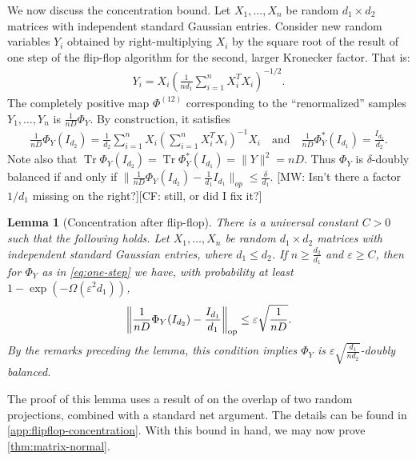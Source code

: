 \documentclass[aos]{imsart}
\newtheorem{lemma}[theorem]{Lemma}
\theoremstyle{definition}
\numberwithin{equation}{section}
\DeclareMathOperator{\op}{op}
\DeclareMathOperator{\tr}{Tr}
\DeclarePairedDelimiter{\norm}{\lVert}{\rVert}
\newcommand{\eps}{\varepsilon}
\newcommand{\CF}[1]{{\color{purple}[CF: #1]}}
\newcommand{\MW}[1]{{\color{red}[MW: #1]}}
\begin{document}
We now discuss the concentration bound.
Let $X_1,\dots,X_n$ be random $d_1 \times d_2$ matrices with independent standard Gaussian entries.
Consider new random variables $Y_i$ obtained by right-multiplying $X_i$ by the square root of the result of one step of the flip-flop algorithm for the second, larger Kronecker factor.
That is:
\begin{align*}
  Y_i = X_i \left( \frac1{nd_1} \sum_{i=1}^n X_i^T X_i \right)^{-1/2}.
\end{align*}
The completely positive map $\Phi^{(12)}$ corresponding to the ``renormalized'' samples $Y_1,\dots,Y_n$ is $\frac1{nD} \Phi_Y$.
By construction, it satisfies
\begin{align}\label{eq:one-step}
  \frac1{n D} \Phi_Y(I_{d_2}) = \frac1{d_2} \sum_{i=1}^{n} X_i \left( \sum_{i=1}^n X_i^T X_i \right)^{-1} X_i
\quad\text{and}\quad
  \frac1{n D} \Phi^*_Y(I_{d_1}) = \frac{I_{d_2}}{d_2}.
\end{align}
Note also that $\tr \Phi_Y(I_{d_2}) = \tr \Phi_Y^*(I_{d_1}) = \|Y\|^2 = nD$. Thus $\Phi_Y$ is $\delta$-doubly balanced if and only if $\|\frac{1}{nD} \Phi_Y(I_{d_2}) - \frac{1}{d_1} I_{d_1}\|_{op} \leq \frac{\delta}{d_1}$.
\MW{Isn't there a factor $1/d_1$ missing on the right?}\CF{still, or did I fix it?}

\begin{lemma}[Concentration after flip-flop]\label{lem:flipflop-concentration}
There is a universal constant $C>0$ such that the following holds.
Let $X_1,\dots,X_n$ be random $d_1 \times d_2$ matrices with independent standard Gaussian entries, where $d_1 \leq d_2$.
If $n \geq \frac{d_2}{d_1}$ and $\eps\geq C$, then for $\Phi_Y$ as in \cref{eq:one-step} we have, with probability at least $1 - \exp(- \Omega( \eps^2 d_{1}))$,
\begin{align*}
  \norm*{\frac1{n D} \Phi_Y(I_{d_2}) - \frac{I_{d_1}}{d_1}}_{\op} \leq \eps \sqrt{\frac1{nD}}.
\end{align*}
By the remarks preceding the lemma, this condition implies $\Phi_Y$ is $\eps \sqrt{\frac{d_1}{nd_2}}$-doubly balanced.
\end{lemma}

The proof of this lemma uses a result of \cite{hayden2006aspects} on the overlap of two random projections, combined with a standard net argument.
The details can be found in \cref{app:flipflop-concentration}.
With this bound in hand, we may now prove \cref{thm:matrix-normal}.
\end{document}
